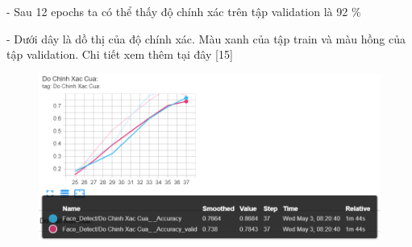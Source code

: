 \documentclass[12pt, a4paper]{article}
\begin{document}
\par- Sau 12 epochs ta có thể thấy độ chính xác trên tập validation là 92 $\%$
\par- Dưới dây là dồ thị của độ chính xác. Màu xanh của tập train và màu hồng của tập validation.
Chi tiết xem thêm tại đây [15]

\begin{figure}[h] %
    \centering
    \includegraphics[scale = 0.6]{Img/Face/P2.png}
\end{figure}
\end{document}
